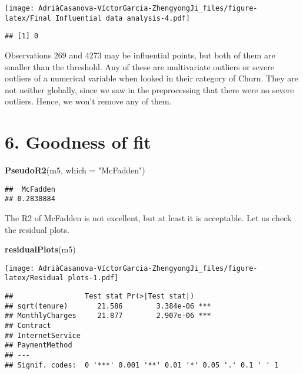 \documentclass[
]{article}
\newenvironment{Shaded}{\begin{snugshade}}{\end{snugshade}}
\newcommand{\AttributeTok}[1]{\textcolor[rgb]{0.13,0.29,0.53}{#1}}
\newcommand{\FunctionTok}[1]{\textcolor[rgb]{0.13,0.29,0.53}{\textbf{#1}}}
\newcommand{\NormalTok}[1]{#1}
\newcommand{\StringTok}[1]{\textcolor[rgb]{0.31,0.60,0.02}{#1}}
\begin{document}
\texttt{[image: AdriàCasanova-VíctorGarcia-ZhengyongJi\_files/figure-latex/Final Influential data analysis-4.pdf]}

\begin{verbatim}
## [1] 0
\end{verbatim}

Observations 269 and 4273 may be influential points, but both of them
are smaller than the threshold. Any of these are multivariate outliers
or severe outliers of a numerical variable when looked in their category
of Churn. They are not neither globally, since we saw in the
preprocessing that there were no severe outliers. Hence, we won't remove
any of them.

\hypertarget{goodness-of-fit}{%
\section{6. Goodness of fit}\label{goodness-of-fit}}

\begin{Shaded}
\begin{Highlighting}[]
\FunctionTok{PseudoR2}\NormalTok{(m5, }\AttributeTok{which =} \StringTok{"McFadden"}\NormalTok{)}
\end{Highlighting}
\end{Shaded}

\begin{verbatim}
##  McFadden 
## 0.2830884
\end{verbatim}

The R2 of McFadden is not excellent, but at least it is acceptable. Let
us check the residual plots.

\begin{Shaded}
\begin{Highlighting}[]
\FunctionTok{residualPlots}\NormalTok{(m5)}
\end{Highlighting}
\end{Shaded}

\texttt{[image: AdriàCasanova-VíctorGarcia-ZhengyongJi\_files/figure-latex/Residual plots-1.pdf]}

\begin{verbatim}
##                 Test stat Pr(>|Test stat|)    
## sqrt(tenure)       21.586        3.384e-06 ***
## MonthlyCharges     21.877        2.907e-06 ***
## Contract                                      
## InternetService                               
## PaymentMethod                                 
## ---
## Signif. codes:  0 '***' 0.001 '**' 0.01 '*' 0.05 '.' 0.1 ' ' 1
\end{verbatim}
\end{document}
